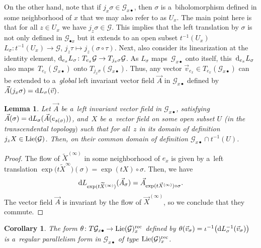 \documentclass[10pt,a4paper]{amsart}
\numberwithin{equation}{section}
\newtheorem{Corollary}[Theorem]{Corollary}
\newtheorem{Lemma}[Theorem]{Lemma}
\theoremstyle{definition}
\begin{document}
On the other hand, note that if $j_x\sigma \in \mathcal G_{x\bullet}$, then $\sigma$ is a~biholomorphism defined in some neighborhood of $x$ that we may also refer to as $U_x$. The main point here is that for all $z\in U_x$ we have $j_z\sigma \in \mathcal G$. This implies that the left translation by $\sigma$ is not only defined in $\mathcal G_{\bullet x}$ but it extends to an open subset $t^{-1}(U_x)$
$L_\sigma \colon t^{-1}(U_x) \to \mathcal G$, $ j_z\tau \mapsto j_z(\sigma \circ \tau)$.
Next, also consider its linearization at the identity element,
${\rm d}_{e_x}L_{\sigma} \colon T_{e_x} \mathcal G \to T_{j_x\sigma} \mathcal G$.
As $L_\sigma$ maps~$\mathcal G_{x\bullet}$ onto itself, this~${\rm d}_{e_x}L_{\sigma}$ also maps~$T_{e_x}(\mathcal G_{x\bullet})$ onto $T_{j_x\sigma}(\mathcal G_{x\bullet})$. Thus, any vector ${\vec v_{e_x} \in T_{e_x}(\mathcal G_{x\bullet})}$ can be extended to a~\emph{global} left invariant vector field $\vec A$ in $\mathcal G_{x\bullet}$ defined by $\vec A(j_x\sigma) = {\rm d}L_{\sigma}(\vec v)$.

\begin{Lemma}
Let $\vec A$ be a~left invariant vector field in $\mathcal G_{x\bullet}$, satisfying $\vec A(\sigma) = {\rm d}L_{\sigma}(\vec A(e_{s(\sigma)}))$, and~$X$ be a~vector field on some open subset $U$ {\rm(}in the transcendental topology$)$ such that for all~$z$ in its domain of definition $j_zX \in {\rm Lie}(\mathcal G)$. Then,
on their common domain of definition $\mathcal G_{x\bullet}\cap t^{-1}(U)$.
\end{Lemma}

\begin{proof}
The flow of $\widetilde X^{(\infty)}$ in some neighborhood of $e_x$ is given by a~left translation
$\exp\bigl(t\widetilde X^{\infty}\bigr)(\sigma) \allowbreak= \exp(t X)\circ \sigma$.
Then, we have
\[{\rm d} L_{\exp(t\widetilde X^{(\infty)})}(\vec A_{\sigma}) = \vec A_{\exp(t\vec X^{(\infty)})\circ \sigma}.\]
The vector field $\vec A$ is invariant by the flow of $\vec X^{(\infty)}$, so we conclude that they commute.
\end{proof}

\begin{Corollary}
The form $\theta \colon T\mathcal G_{x\bullet} \to {\rm Lie}(\mathcal G)_{x}^{\rm rec}$ defined by
$\theta(\vec v_{\sigma}) = \iota^{-1}\bigl({\rm d}L_{\sigma}^{-1}(\vec v_\sigma)\bigr)$ is a~regular parallelism form in $\mathcal G_{x\bullet}$ of type ${\rm Lie}(\mathcal G)_{x}^{\rm rec}$.
\end{Corollary}
\end{document}
